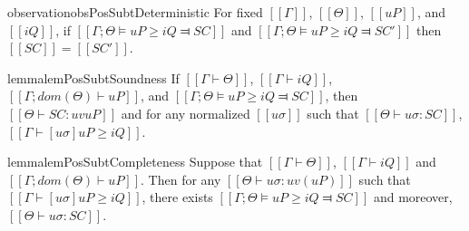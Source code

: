 \begin{restatable}{observation}{obsPosSubtDeterministic}
    \label{obs:pos-subt-deterministic}
    For fixed $[[Γ]]$, $[[Θ]]$, $[[uP]]$, and $[[iQ]]$,
    if $[[Γ ; Θ ⊨ uP ≥ iQ ⫤ SC]]$ and $[[Γ ; Θ ⊨ uP ≥ iQ ⫤ SC']]$
    then $[[SC]] = [[SC']]$.
\end{restatable}

\begin{restatable}{lemma}{lemPosSubtSoundness} \label{lemma:pos-subt-soundness}
    If $[[Γ ⊢ Θ]]$, $[[Γ ⊢ iQ]]$, $[[Γ ; dom(Θ) ⊢  uP]]$, and 
    $[[Γ ; Θ ⊨ uP ≥ iQ ⫤ SC]]$,
    then $[[Θ ⊢ SC : uv uP]]$ and
    for any normalized $[[uσ]]$ such that $[[ Θ ⊢ uσ : SC ]]$,
    $[[ Γ ⊢ [uσ]uP ≥ iQ ]]$.
\end{restatable}

\begin{restatable}{lemma}{lemPosSubtCompleteness} \label{lemma:pos-subt-completeness}
    Suppose that $[[Γ ⊢ Θ]]$, $[[Γ ⊢ iQ]]$ and $[[Γ ; dom(Θ) ⊢  uP]]$.
    Then for any $[[Θ ⊢ uσ : uv(uP)]]$ such that $[[ Γ ⊢ [uσ]uP ≥ iQ ]]$,
    there exists $[[Γ; Θ ⊨ uP ≥ iQ ⫤ SC]]$ and moreover, $[[ Θ ⊢ uσ : SC ]]$.
\end{restatable}
